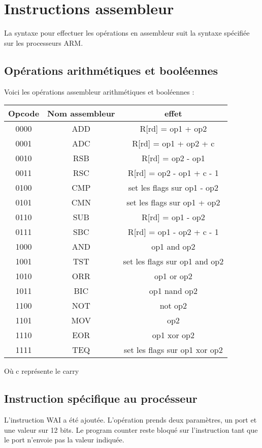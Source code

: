 \documentclass[a4paper]{article}
\begin{document}
\section{Instructions assembleur}

La syntaxe pour effectuer les opérations en assembleur suit la syntaxe spécifiée
sur les processeurs ARM.

\subsection{Opérations arithmétiques et booléennes}

Voici les opérations assembleur arithmétiques et booléennes :\\

\begin{tabular}{|c|c|c|}
  \hline
  Opcode & Nom assembleur & effet \\
  \hline
  0000 & ADD & R[rd] = op1 + op2\\
  0001 & ADC & R[rd] = op1 + op2 + c\\
  0010 & RSB & R[rd] = op2 - op1\\
  0011 & RSC & R[rd] = op2 - op1 + c - 1\\
  0100 & CMP & set les flags sur op1 - op2\\
  0101 & CMN & set les flags sur op1 + op2\\
  0110 & SUB & R[rd] = op1 - op2 \\
  0111 & SBC & R[rd] = op1 - op2 + c - 1\\
  1000 & AND & op1 and op2\\
  1001 & TST & set les flags sur op1 and op2\\
  1010 & ORR & op1 or op2\\
  1011 & BIC & op1 nand op2\\
  1100 & NOT & not op2\\
  1101 & MOV & op2\\
  1110 & EOR & op1 xor op2\\
  1111 & TEQ & set les flags sur op1 xor op2\\
  \hline
\end{tabular}

Où c représente le carry

\subsection{Instruction spécifique au procésseur}

L'instruction WAI a été ajoutée. L'opération prends deux paramètres, un port et
une valeur sur 12 bits. Le program counter reste bloqué sur l'instruction tant
que le port n'envoie pas la valeur indiquée.
\end{document}
